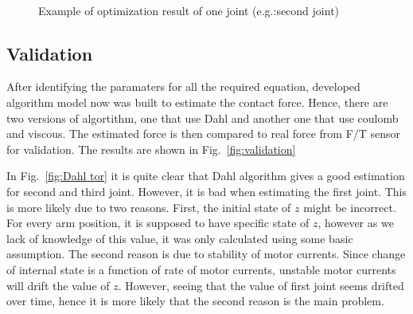 \documentclass[letterpaper, 10 pt, conference]{ieeeconf}
\newcommand{\fref}[1]{Fig.~\ref{#1}}
\begin{document}
\begin{figure}
  \centering
  \,
  \,
  \caption{Example of optimization result of one joint (e.g.:second joint)}
  \label{fig:optimization}
\end{figure}

\subsection{Validation}
\label{validation}

After identifying the paramaters for all the required equation, developed algorithm model now was built to estimate the contact force. Hence, there are two versions of algortithm, one that use Dahl and another one that use coulomb and viscous. The estimated force is then compared to real force from F/T sensor for validation. The results are shown in \fref{fig:validation} 

In \fref{fig:Dahl tor} it is quite clear that Dahl algorithm gives a good estimation for second and third joint. However, it is bad when estimating the first joint. This is more likely due to two reasons. First, the initial state of $z$ might be incorrect. For every arm position, it is supposed to have specific state of $z$, however as we lack of knowledge of this value, it was only calculated using some basic assumption. The second reason is due to stability of motor currents. Since change of internal state is a function of rate of motor currents, unstable motor currents will drift the value of $z$. However, seeing that the value of first joint seems drifted over time, hence it is more likely that the second reason is the main problem.
\end{document}
